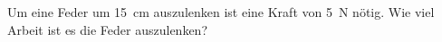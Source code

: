 
\begin{aufgabe}
	Um eine Feder um \SI{15}{cm} auszulenken ist eine Kraft von \SI{5}{N} nötig.
	Wie viel Arbeit ist es die Feder auszulenken?
\end{aufgabe}
\begin{loesung}

\end{loesung}
